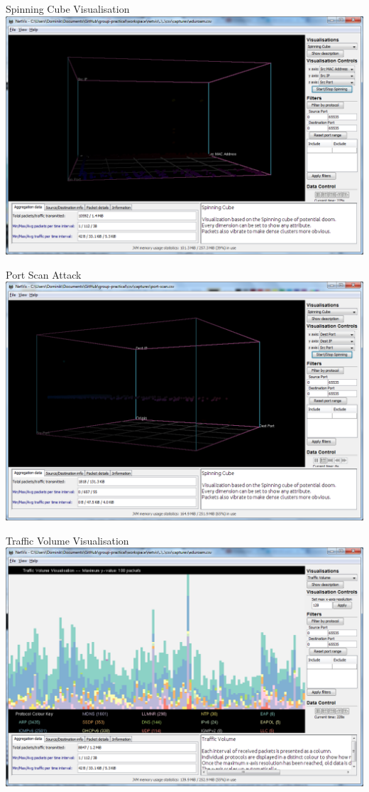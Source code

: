 \documentclass{beamer}
\begin{document}
    \begin{frame}{Spinning Cube Visualisation}
	\includegraphics[width=\textwidth,keepaspectratio]{img/Cube.png}
    \end{frame}

    \begin{frame}{Port Scan Attack}
	\includegraphics[width=\textwidth,keepaspectratio]{img/PortScanCube.png}
    \end{frame}

    \begin{frame}{Traffic Volume Visualisation}
	\includegraphics[width=\textwidth,keepaspectratio]{img/TrafficVolume.png}
    \end{frame}
\end{document}
